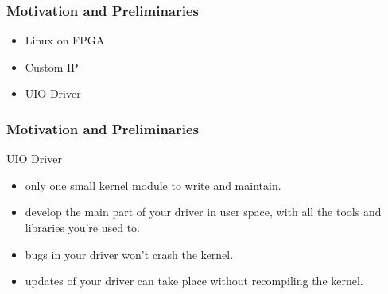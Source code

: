 \documentclass{beamer}
\begin{document}
\begin{frame}
\frametitle{\textcolor[rgb]{0.5,0.5,0.3}{Motivation} and Preliminaries}
\begin{itemize}
\item Linux on FPGA
\item Custom IP
\item \alert{UIO Driver}
\end{itemize}
\end{frame}

\begin{frame}
\frametitle{\textcolor[rgb]{0.5,0.5,0.3}{Motivation} and Preliminaries}
\centering UIO Driver
\centering \\
\begin{itemize}
\item only one small kernel module to write and maintain.
\item develop the main part of your driver in user space, with all the tools and libraries you’re used to.
\item bugs in your driver won’t crash the kernel.
\item updates of your driver can take place without recompiling the kernel.
\end{itemize}
\end{frame}
\end{document}
